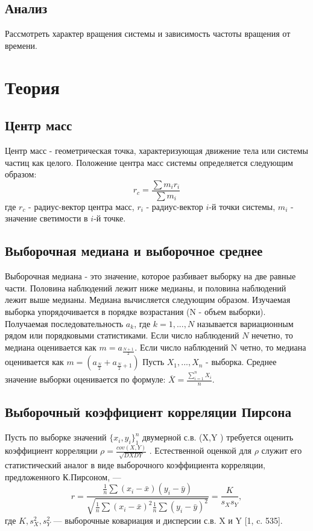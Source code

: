\documentclass[a4paper,12pt]{article} %
\begin{document}
	\subsection{Анализ}
	Рассмотреть характер вращения системы и зависимость частоты вращения от времени.
	
	
	\section{Теория}
	\subsection{Центр масс}
	Центр масс - геометрическая точка, характеризующая движение тела или системы частиц как целого. 
	Положение центра масс системы определяется следующим образом:
	\begin{equation}
	r_{c}= \frac{\sum m_{i}r_{i}}{\sum m_{i}}
	\end{equation}
	где $r_{c}$ - радиус-вектор центра масс, $r_{i}$ -  радиус-вектор $i$-й точки системы, $m_{i}$ - значение светимости в $i$-й точке.
	
	\subsection{Выборочная медиана и выборочное среднее}
	Выборочная медиана - это значение, которое разбивает выборку на две равные части. Половина наблюдений лежит ниже медианы, и половина наблюдений лежит выше медианы.
	Медиана вычисляется следующим образом. Изучаемая выборка упорядочивается в порядке возрастания (N - объем выборки). Получаемая последовательность $a_{k}$, где $k=1,...,N$ называется вариационным рядом или порядковыми статистиками. Если число наблюдений $N$ нечетно, то медиана оценивается как $m=a_{\frac{N+1}{2}}$.
	Если число наблюдений N четно, то медиана оценивается как $m=(a_{\frac{N}{2}} + a_{\frac{N}{2} + 1})$
	\newline Пусть $X_{1}, ..., X_{n}$ - выборка. Среднее значение выборки оценивается по формуле: $\overline{X}= \frac{\sum_{i=1}^{n}X_{i}}{n}$.
	
	\subsection{Выборочный коэффициент корреляции Пирсона}
	Пусть по выборке значений $\{x_{i},y_{i}\}^{n}_{1}$ двумерной с.в. (X,Y ) требуется оценить коэффициент корреляции $\rho = \frac{cov(X,Y)}{\sqrt{DXDY}}$ . Естественной оценкой для $\rho$ служит его статистический аналог в виде выборочного коэффициента корреляции, предложенного К.Пирсоном, —
	\begin{equation}
	r = \frac{
		\frac{1}{n}\sum{(x_{i} - \bar{x})(y_{i}-\bar{y})}
	}{
		\sqrt{\frac{1}{n}\sum{(x_{i} - \bar{x})^{2}}\frac{1}{n}\sum{(y_{i} - \bar{y})^{2}}}
	}=\frac{K}{s_{X}s_{Y}},
	\label{r}
	\end{equation}
	где $K,s^{2}_{X},s^{2}_{Y}$ — выборочные ковариация и дисперсии с.в. X и Y [1, c. 535].
\end{document}
